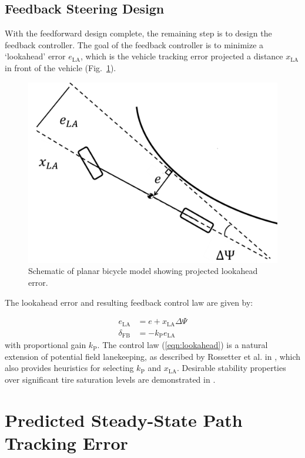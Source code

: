 \documentclass{nVSD2e}
\theoremstyle{plain}
\theoremstyle{definition}
\theoremstyle{remark}
\begin{document}
\subsection{Feedback Steering Design}
\label{sec:lookahead}

With the feedforward design complete, the remaining step is to design the feedback controller. The goal of the feedback controller is to
minimize a `lookahead' error $e_\mathrm{LA}$, which is the vehicle tracking error projected a distance 
$x_\mathrm{LA}$ in front of the vehicle (Fig.~\ref{fig:lookaheadSchematic}).

\begin{figure}[h]
\centering
\includegraphics[width=.5\columnwidth]{figures/LookaheadSchematic.png}
\caption{Schematic of planar bicycle model showing projected lookahead error.}
\label{fig:lookaheadSchematic}
\end{figure}

The lookahead error and resulting feedback control law are given by:

\begin{subequations}
\label{eqn:lookahead}
\begin{align}
	e_\mathrm{LA}&=e+x_\mathrm{LA}\Delta\Psi \\
	\delta_\mathrm{FB} &= -k_\mathrm{P}e_\mathrm{LA}
\end{align}
\end{subequations}
with proportional gain $k_\mathrm{P}$. The control law (\ref{eqn:lookahead}) is a natural extension of potential field lanekeeping, as described by Rossetter et al. in \cite{rosseter}, which also provides heuristics for 
selecting $k_\mathrm{P}$ and $x_\mathrm{LA}$. Desirable stability properties over significant tire saturation levels are demonstrated in \cite{talvala}. 

\section{Predicted Steady-State Path Tracking Error}
\label{sec:predSS}
\end{document}

